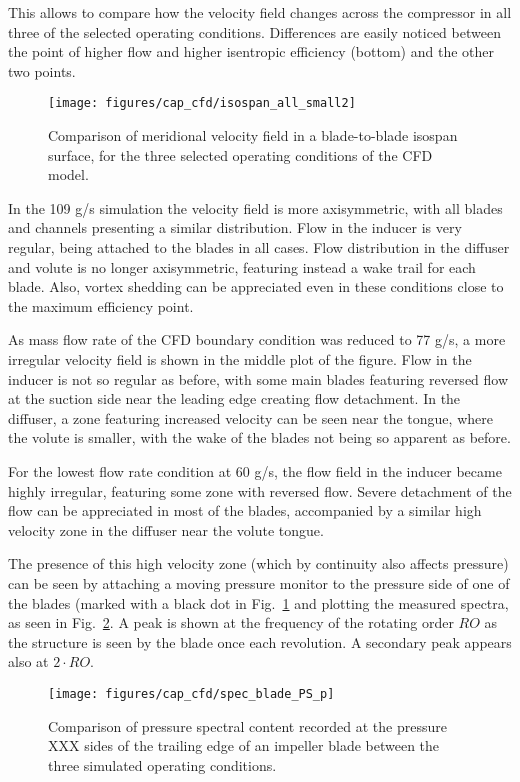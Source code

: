 This allows to compare how the velocity field changes across the compressor in all three of the selected operating conditions. Differences are easily noticed between the point of higher flow and higher isentropic efficiency (bottom) and the other two points. 

\begin{figure}[htb!]
\centering
\texttt{[image: figures/cap\_cfd/isospan\_all\_small2]}
\caption{Comparison of meridional velocity field in a blade-to-blade isospan surface, for the three selected operating conditions of the CFD model.}
\label{fig:cfd_isospan_all}
\end{figure}

In the 109 g/s simulation the velocity field is more axisymmetric, with all blades and channels presenting a similar distribution. Flow in the inducer is very regular, being attached to the blades in all cases. Flow distribution in the diffuser and volute is no longer axisymmetric, featuring instead a wake trail for each blade. Also, vortex shedding can be appreciated even in these conditions close to the maximum efficiency point.

As mass flow rate of the CFD boundary condition was reduced to 77 g/s, a more irregular velocity field is shown in the middle plot of the figure. Flow in the inducer is not so regular as before, with some main blades featuring reversed flow at the suction side near the leading edge creating flow detachment. In the diffuser, a zone featuring increased velocity can be seen near the tongue, where the volute is smaller, with the wake of the blades not being so apparent as before.

For the lowest flow rate condition at 60 g/s, the flow field in the inducer became highly irregular, featuring some zone with reversed flow. Severe detachment of the flow can be appreciated in most of the blades, accompanied by a similar high velocity zone in the diffuser near the volute tongue. 

The presence of this high velocity zone (which by continuity also affects pressure) can be seen by attaching a moving pressure monitor to the pressure side of one of the blades (marked with a black dot in Fig.~\ref{fig:cfd_isospan_all} and plotting the measured spectra, as seen in Fig.~\ref{fig:cfd_spec_blade_p}. A peak is shown at the frequency of the rotating order $RO$ as the structure is seen by the blade once each revolution. A secondary peak appears also at $2\cdot RO$. 

\begin{figure}[htb!]
\centering
\texttt{[image: figures/cap\_cfd/spec\_blade\_PS\_p]}\\[5mm]
\caption{Comparison of pressure spectral content recorded at the pressure XXX sides of the trailing edge of an impeller blade between the three simulated operating conditions.}
\label{fig:cfd_spec_blade_p}
\end{figure}

